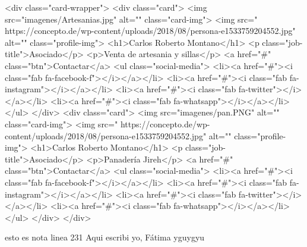 <div class="card-wrapper">
  <div class="card">
    <img src="imagenes/Artesanias.jpg" alt="" class="card-img">
    <img src=" https://concepto.de/wp-content/uploads/2018/08/persona-e1533759204552.jpg" alt="" class="profile-img">
    <h1>Carlos Roberto Montano</h1>
    <p class="job-title">Asociado</p>
    <p>Venta de artesania y sillas</p>
    <a href="#" class="btn">Contactar</a>
    <ul class="social-media">
      <li><a href="#"><i class="fab fa-facebook-f"></i></a></li> 
      <li><a href="#"><i class="fab fa-instagram"></i></a></li>   
      <li><a href="#"><i class="fab fa-twitter"></i></a></li>   
      <li><a href="#"><i class="fab fa-whatsapp"></i></a></li>     
    </ul>
  </div>
<div class="card">
    <img src="imagenes/pan.PNG" alt="" class="card-img">
    <img src=" https://concepto.de/wp-content/uploads/2018/08/persona-e1533759204552.jpg" alt="" class="profile-img">
    <h1>Carlos Roberto Montano</h1>
    <p class="job-title">Asociado</p>
    <p>Panadería Jireh</p>
    <a href="#" class="btn">Contactar</a>
    <ul class="social-media">
      <li><a href="#"><i class="fab fa-facebook-f"></i></a></li> 
      <li><a href="#"><i class="fab fa-instagram"></i></a></li>   
      <li><a href="#"><i class="fab fa-twitter"></i></a></li>   
      <li><a href="#"><i class="fab fa-whatsapp"></i></a></li>     
    </ul>
  </div>
</div>

esto es nota linea 231
Aqui escribi yo, Fátima
yguygyu